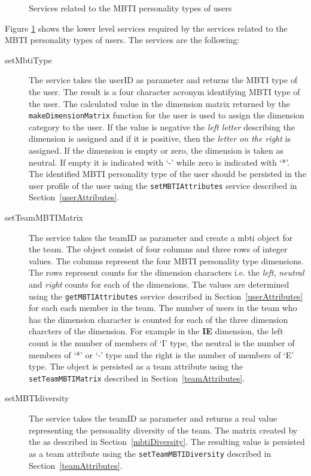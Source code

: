 \begin{figure}[htb]
\begin{center}
\end{center}
\caption{Services related to the MBTI personality types of users \label{fig:mbti_functionalRequirements}}
\end{figure}

Figure \ref{fig:mbti_functionalRequirements} shows the lower level services required by the services related to the MBTI personality types of users. The services are the following:

\begin{description}

\item[setMbtiType] The service takes the userID as parameter and returns the MBTI type of the user. The result is a four character acronym identifying MBTI type of the user. The calculated value in the dimension matrix returned by the \texttt{makeDimensionMatrix} function for the user is used to assign the dimension category to the user. If the value is negative the \textit{left letter} describing the dimension is assigned and if it is positive, then the \textit{letter on the right} is assigned. If the dimension is empty or zero, the dimension is taken as neutral. If empty it is indicated with `-' while zero is indicated with `*'.  The identified MBTI personality type of the user should be persisted in the user profile of the user using the \texttt{setMBTIAttributes} service described in Section~\ref{userAttributes}.

\item[setTeamMBTIMatrix] The service takes the teamID as parameter and create a mbti object for the team. The object consist of four columns and three rows of integer values. The columns represent the four MBTI personality type dimensions. The rows represent counts for the dimension characters  i.e. the \textit{left}, \textit{neutral} and \textit{right} counts for each of the dimensions. The values are determined using the \texttt{getMBTIAttributes} service described in Section~\ref{userAttributes} for each each member in the team. The number of users in the team who has the dimension character is counted for each of the three dimension charcters of the dimension. For example in the \textbf{IE} dimension, the left count is the number of members of `I' type, the neutral is the number of members of `*' or `-' type and the right is the number of members of `E' type. The object is persisted as a team attribute using the \texttt{setTeamMBTIMatrix} described in Section~\ref{teamAttributes}.

\item[setMBTIdiversity] The service takes the teamID as parameter and returns a real value representing the personality diversity of the team. The matrix created by the  as described in Section~\ref{mbtiDiversity}. The resulting value is persisted as a team attribute using the \texttt{setTeamMBTIDiversity} described in Section~\ref{teamAttributes}.
\end{description}  


